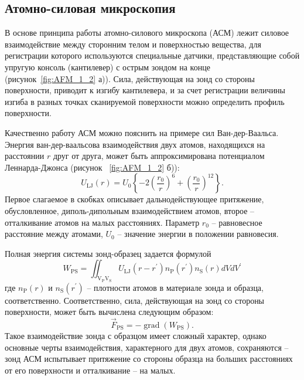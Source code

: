 \subsection*{Атомно-силовая микроскопия}

В основе принципа работы атомно-силового микроскопа (АСМ) лежит силовое взаимодействие между сторонним телом и поверхностью вещества, для регистрации которого используются специальные датчики, представляющие собой упругую консоль (кантилевер) с острым зондом на конце (рисунок~\ref{fig:AFM_1_2} а)). Сила, действующая на зонд со стороны поверхности, приводит к изгибу кантилевера, и за счет регистрации величины изгиба в разных точках сканируемой поверхности можно определить профиль поверхности.

Качественно работу АСМ можно пояснить на примере сил Ван-дер-Ваальса. Энергия ван-дер-ваальсова взаимодействия двух атомов, находящихся на расстоянии $r$ друг от друга, может быть аппроксимирована потенциалом Леннарда-Джонса (рисунок ~\ref{fig:AFM_1_2} б)):
\begin{equation}
	U_\mathrm{LJ}(r) = U_0\left\{-2\left(\frac{r_0}{r}\right)^6+\left(\frac{r_0}{r}\right)^{12}\right\}.
\end{equation}
Первое слагаемое в скобках описывает дальнодействующее притяжение, обусловленное, диполь-дипольным взаимодействием атомов, второе -- отталкивание атомов на малых расстояниях. Параметр $r_0$ -- равновесное расстояние между атомами, $U_0$ -- значение энергии в положении равновесия. 

Полная энергия системы зонд-образец задается формулой
\begin{equation}
	W_\mathrm{PS}=\iint_{\mathrm{V}_\mathrm{P} \mathrm{V}_\mathrm{S}} U_\mathrm{LJ}\left(r-r^{\prime}\right) n_\mathrm{P}\left(r^{\prime}\right) n_\mathrm{S}(r) d V d V^{\prime}
\end{equation}
где $n_\mathrm{P}(r)$ и $n_\mathrm{S}(r^\prime)$ -- плотности атомов в материале зонда и образца, соответственно. Соответственно, сила, действующая на зонд со стороны поверхности, может быть вычислена следующим образом:
\begin{equation}
	\vec{F}_\mathrm{PS} = -\operatorname{grad}\left(W_\mathrm{PS}\right).
\end{equation}
Такое взаимодействие зонда с образцом имеет сложный характер, однако основные черты взаимодействия, характерного для двух атомов, сохраняются -- зонд АСМ испытывает притяжение со стороны образца на больших расстояниях от его поверхности и отталкивание -- на малых.

